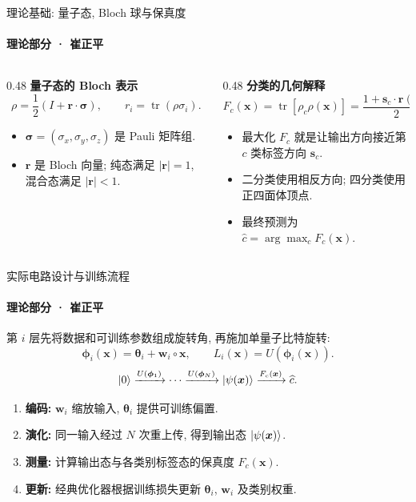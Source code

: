 \documentclass{ctexbeamer}
\begin{document}
\begin{frame}{理论基础: 量子态, Bloch 球与保真度}
    \framesubtitle{理论部分 · 崔正平}
    \begin{columns}[T]
        \begin{column}{0.48\textwidth}
            \textbf{量子态的 Bloch 表示}
            \[
                \rho=\frac12\left(I+\bm{r}\cdot\bm{\sigma}\right),
                \qquad r_i=\operatorname{tr}(\rho\sigma_i).
            \]
            \begin{itemize}
                \setlength{\itemsep}{0.9ex}
                \item $\bm{\sigma}=(\sigma_x,\sigma_y,\sigma_z)$ 是 Pauli 矩阵组.
                \item $\bm{r}$ 是 Bloch 向量; 纯态满足 $|\bm{r}|=1$, 混合态满足 $|\bm{r}|<1$.
            \end{itemize}
        \end{column}
        \begin{column}{0.48\textwidth}
            \textbf{分类的几何解释}
            \[
                F_c(\bm{x})
                =\operatorname{tr}\!\left[\rho_c\rho(\bm{x})\right]
                =\frac{1+\bm{s}_c\cdot\bm{r}(\bm{x})}{2}.
            \]
            \begin{itemize}
                \setlength{\itemsep}{0.9ex}
                \item 最大化 $F_c$ 就是让输出方向接近第 $c$ 类标签方向 $\bm{s}_c$.
                \item 二分类使用相反方向; 四分类使用正四面体顶点.
                \item 最终预测为 $\widehat c=\arg\max_c F_c(\bm{x})$.
            \end{itemize}
        \end{column}
    \end{columns}
\end{frame}

\begin{frame}{实际电路设计与训练流程}
    \framesubtitle{理论部分 · 崔正平}
    第 $i$ 层先将数据和可训练参数组成旋转角, 再施加单量子比特旋转:
    \[
        \bm{\phi}_i(\bm{x})=\bm{\theta}_i+\bm{w}_i\circ\bm{x},
        \qquad
        L_i(\bm{x})=U\!\left(\bm{\phi}_i(\bm{x})\right).
    \]
    \[
        \ket{0}
        \xrightarrow{U(\bm{\phi}_1)}
        \cdots
        \xrightarrow{U(\bm{\phi}_N)}
        \ket{\psi(\bm{x})}
        \xrightarrow{F_c(\bm{x})}
        \widehat c .
    \]
    \begin{enumerate}
        \setlength{\itemsep}{0.9ex}
        \item \textbf{编码:} $\bm{w}_i$ 缩放输入, $\bm{\theta}_i$ 提供可训练偏置.
        \item \textbf{演化:} 同一输入经过 $N$ 次重上传, 得到输出态 $\ket{\psi(\bm{x})}$.
        \item \textbf{测量:} 计算输出态与各类别标签态的保真度 $F_c(\bm{x})$.
        \item \textbf{更新:} 经典优化器根据训练损失更新 $\bm{\theta}_i$, $\bm{w}_i$ 及类别权重.
    \end{enumerate}
\end{frame}
\end{document}
